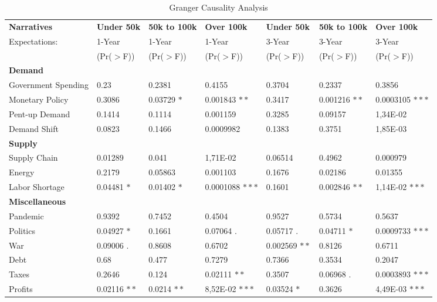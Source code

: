 
\begin{sidewaystable}[H]
	\footnotesize
	\centering
	\caption{Granger Causality Analysis}\label{tab:granger_inc}
	\begin{tabular}{l|p{3cm} |p{3cm} |p{3cm} |p{3cm} |p{3cm} |p{3cm}}
		\toprule
		\textbf{Narratives} & \textbf{Under 50k} & \textbf{50k to 100k} & \textbf{Over 100k}  & \textbf{Under 50k} & \textbf{50k to 100k} & \textbf{Over 100k} \\
		 Expectations: & 1-Year & 1-Year & 1-Year & 3-Year & 3-Year & 3-Year \\
		& (Pr($>$F)) & (Pr($>$F)) & (Pr($>$F)) & (Pr($>$F)) & (Pr($>$F)) & (Pr($>$F)) \\
		\midrule
		\multicolumn{7}{l}{\textbf{Demand}} \\
		\midrule
		Government Spending & 0.23 & 0.2381 & 0.4155 & 0.3704 & 0.2337 & 0.3856 \\
		Monetary Policy     & 0.3086 & 0.03729 $\ast$ & 0.001843 $\ast\ast$ & 0.3417 & 0.001216 $\ast\ast$ &  0.0003105 $\ast\ast\ast$\\
		Pent-up Demand      & 0.1414 & 0.1114 & 0.001159 & 0.3285 & 0.09157 &  1,34E-02 \\
		Demand Shift        & 0.0823 & 0.1466 & 0.0009982 &  0.1383 & 0.3751 & 1,85E-03 \\
		\midrule
		\multicolumn{7}{l}{\textbf{Supply}} \\
		\midrule
		Supply Chain        & 0.01289 & 0.041 & 1,71E-02 &	0.06514 & 0.4962 &	0.000979 \\
		Energy              & 0.2179  & 0.05863 & 0.001103 & 0.1676 & 0.02186 & 0.01355 \\
		Labor Shortage      & 0.04481 $\ast$ & 0.01402 $\ast$ & 0.0001088 $\ast\ast\ast$ & 0.1601 & 0.002846 $\ast\ast$ & 1,14E-02 $\ast\ast\ast$ \\
		\midrule
		\multicolumn{7}{l}{\textbf{Miscellaneous}} \\
		\midrule
		Pandemic            & 0.9392  & 0.7452 & 0.4504 & 0.9527 & 0.5734 & 0.5637 \\
		Politics            & 0.04927 $\ast$  & 0.1661 & 0.07064 $.$ & 0.05717 $.$ & 0.04711 $\ast$ & 0.0009733 $\ast\ast\ast$\\
		War                 & 0.09006 $.$ & 0.8608 & 0.6702 & 0.002569 $\ast\ast$ & 0.8126 & 0.6711\\
		Debt                & 0.68  & 0.477 & 0.7279 & 0.7366 & 0.3534 & 0.2047 \\
		Taxes               & 0.2646  & 0.124 & 0.02111 $\ast\ast$ & 0.3507 & 0.06968 $.$ & 0.0003893 $\ast\ast\ast$ \\
		Profits             & 0.02116 $\ast\ast$ & 0.0214 $\ast\ast$ & 8,52E-02 $\ast\ast\ast$ & 0.03524 $\ast$ & 0.3626 & 4,49E-03 $\ast\ast\ast$ \\
		\bottomrule
	\end{tabular}
\end{sidewaystable}

